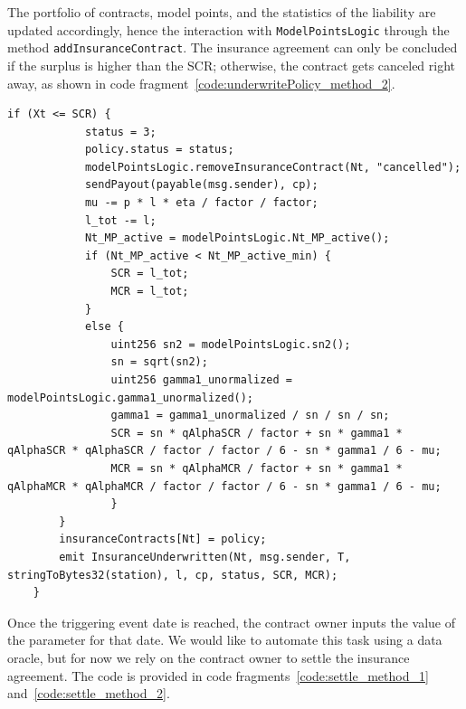 \documentclass[10pt]{article}
\begin{document}
The portfolio of contracts, model points, and the statistics of the liability are updated accordingly, hence the interaction with \texttt{ModelPointsLogic} through the method \texttt{addInsuranceContract}. The insurance agreement can only be concluded if the surplus is higher than the SCR; otherwise, the contract gets canceled right away, as shown in code fragment~\ref{code:underwritePolicy_method_2}.


\begin{codefragment}[!h]
\begin{lstlisting}[language=Solidity]
        if (Xt <= SCR) {
            status = 3;
            policy.status = status;
            modelPointsLogic.removeInsuranceContract(Nt, "cancelled");
            sendPayout(payable(msg.sender), cp);
            mu -= p * l * eta / factor / factor;
            l_tot -= l;
            Nt_MP_active = modelPointsLogic.Nt_MP_active();
            if (Nt_MP_active < Nt_MP_active_min) {
                SCR = l_tot;
                MCR = l_tot;
            }
            else {
                uint256 sn2 = modelPointsLogic.sn2();
                sn = sqrt(sn2);
                uint256 gamma1_unormalized = modelPointsLogic.gamma1_unormalized();
                gamma1 = gamma1_unormalized / sn / sn / sn;
                SCR = sn * qAlphaSCR / factor + sn * gamma1 * qAlphaSCR * qAlphaSCR / factor / factor / 6 - sn * gamma1 / 6 - mu;
                MCR = sn * qAlphaMCR / factor + sn * gamma1 * qAlphaMCR * qAlphaMCR / factor / factor / 6 - sn * gamma1 / 6 - mu;
                }
        } 
        insuranceContracts[Nt] = policy;
        emit InsuranceUnderwritten(Nt, msg.sender, T, stringToBytes32(station), l, cp, status, SCR, MCR);
    }
    \end{lstlisting}
\caption{Part 2 of \texttt{underwritePolicy} method of \texttt{InsuranceLogic}}
    \label{code:underwritePolicy_method_2}
\end{codefragment}

Once the triggering event date is reached, the contract owner inputs the value of the parameter for that date. We would like to automate this task using a data oracle, but for now we rely on the contract owner to settle the insurance agreement. The code is provided in code fragments~\ref{code:settle_method_1} and~\ref{code:settle_method_2}.
\end{document}
